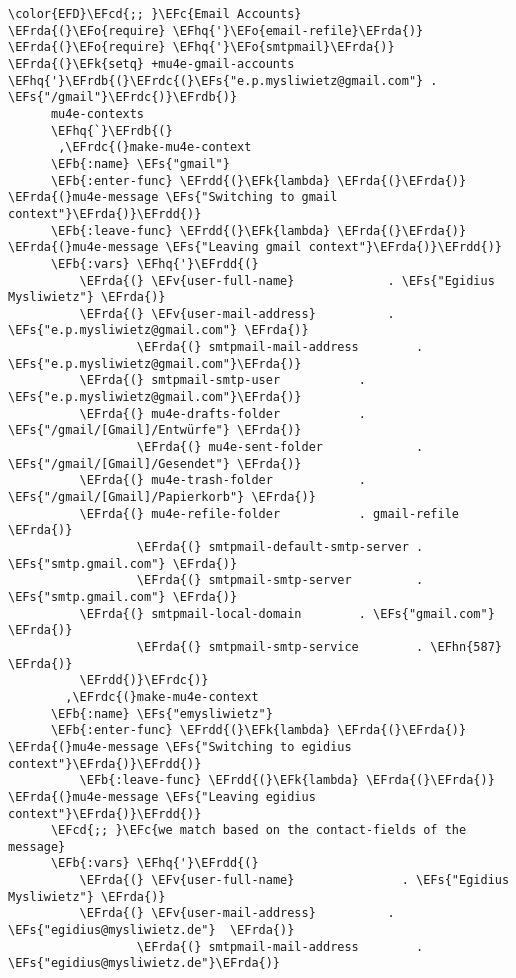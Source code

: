 \documentclass[a4wide,10pt]{article}
\newcommand{\EFc}[1]{\textcolor{EFc}{#1}} %
\newcommand{\EFcd}[1]{\textcolor{EFcd}{#1}} %
\newcommand{\EFs}[1]{\textcolor{EFs}{#1}} %
\newcommand{\EFk}[1]{\textcolor{EFk}{#1}} %
\newcommand{\EFb}[1]{\textcolor{EFb}{#1}} %
\newcommand{\EFv}[1]{\textcolor{EFv}{#1}} %
\newcommand{\EFo}[1]{\textcolor{EFo}{#1}} %
\newcommand{\EFhn}[1]{\textcolor{EFhn}{\textbf{#1}}} %
\newcommand{\EFhq}[1]{\textcolor{EFhq}{#1}} %
\newcommand{\EFrda}[1]{\textcolor{EFrda}{#1}} %
\newcommand{\EFrdb}[1]{\textcolor{EFrdb}{#1}} %
\newcommand{\EFrdc}[1]{\textcolor{EFrdc}{#1}} %
\newcommand{\EFrdd}[1]{\textcolor{EFrdd}{#1}} %
\begin{document}
\begin{Code}
\begin{Verbatim}
\color{EFD}\EFcd{;; }\EFc{Email Accounts}
\EFrda{(}\EFo{require} \EFhq{'}\EFo{email-refile}\EFrda{)}
\EFrda{(}\EFo{require} \EFhq{'}\EFo{smtpmail}\EFrda{)}
\EFrda{(}\EFk{setq} +mu4e-gmail-accounts \EFhq{'}\EFrdb{(}\EFrdc{(}\EFs{"e.p.mysliwietz@gmail.com"} . \EFs{"/gmail"}\EFrdc{)}\EFrdb{)}
      mu4e-contexts
      \EFhq{`}\EFrdb{(}
       ,\EFrdc{(}make-mu4e-context
	  \EFb{:name} \EFs{"gmail"}
	  \EFb{:enter-func} \EFrdd{(}\EFk{lambda} \EFrda{(}\EFrda{)} \EFrda{(}mu4e-message \EFs{"Switching to gmail context"}\EFrda{)}\EFrdd{)}
	  \EFb{:leave-func} \EFrdd{(}\EFk{lambda} \EFrda{(}\EFrda{)} \EFrda{(}mu4e-message \EFs{"Leaving gmail context"}\EFrda{)}\EFrdd{)}
	  \EFb{:vars} \EFhq{'}\EFrdd{(}
		  \EFrda{(} \EFv{user-full-name}	         . \EFs{"Egidius Mysliwietz"} \EFrda{)}
		  \EFrda{(} \EFv{user-mail-address}	         . \EFs{"e.p.mysliwietz@gmail.com"} \EFrda{)}
                  \EFrda{(} smtpmail-mail-address        . \EFs{"e.p.mysliwietz@gmail.com"}\EFrda{)}
		  \EFrda{(} smtpmail-smtp-user           . \EFs{"e.p.mysliwietz@gmail.com"}\EFrda{)}
		  \EFrda{(} mu4e-drafts-folder           . \EFs{"/gmail/[Gmail]/Entwürfe"} \EFrda{)}
                  \EFrda{(} mu4e-sent-folder             . \EFs{"/gmail/[Gmail]/Gesendet"} \EFrda{)}
		  \EFrda{(} mu4e-trash-folder            . \EFs{"/gmail/[Gmail]/Papierkorb"} \EFrda{)}
		  \EFrda{(} mu4e-refile-folder           . gmail-refile \EFrda{)}
                  \EFrda{(} smtpmail-default-smtp-server . \EFs{"smtp.gmail.com"} \EFrda{)}
                  \EFrda{(} smtpmail-smtp-server         . \EFs{"smtp.gmail.com"} \EFrda{)}
		  \EFrda{(} smtpmail-local-domain        . \EFs{"gmail.com"} \EFrda{)}
                  \EFrda{(} smtpmail-smtp-service        . \EFhn{587} \EFrda{)}
		  \EFrdd{)}\EFrdc{)}
        ,\EFrdc{(}make-mu4e-context
	  \EFb{:name} \EFs{"emysliwietz"}
	  \EFb{:enter-func} \EFrdd{(}\EFk{lambda} \EFrda{(}\EFrda{)} \EFrda{(}mu4e-message \EFs{"Switching to egidius context"}\EFrda{)}\EFrdd{)}
          \EFb{:leave-func} \EFrdd{(}\EFk{lambda} \EFrda{(}\EFrda{)} \EFrda{(}mu4e-message \EFs{"Leaving egidius context"}\EFrda{)}\EFrdd{)}
	  \EFcd{;; }\EFc{we match based on the contact-fields of the message}
	  \EFb{:vars} \EFhq{'}\EFrdd{(}
		  \EFrda{(} \EFv{user-full-name}               . \EFs{"Egidius Mysliwietz"} \EFrda{)}
		  \EFrda{(} \EFv{user-mail-address}	         . \EFs{"egidius@mysliwietz.de"}  \EFrda{)}
                  \EFrda{(} smtpmail-mail-address        . \EFs{"egidius@mysliwietz.de"}\EFrda{)}

\end{Verbatim}
\end{Code}
\end{document}
